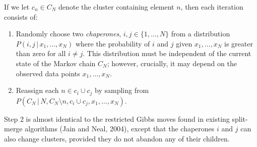 \documentclass[portrait,a0b,final]{a0poster}
\newcommand{\g}{\,|\,}
\newenvironment{poster}{
  \begin{center}
  \begin{minipage}[c]{0.98\textwidth}
}{
  \end{minipage}
  \end{center}
}
\newcommand{\pbox}[4]{
\psshadowbox[#3]{
\begin{minipage}[t][#2][t]{#1}
#4
\end{minipage}
}}
\begin{document}
\begin{poster}
\begin{multicols}{3}
If we let $c_n \in C_N$ denote the cluster containing
element $n$, then each iteration consists of: 
\begin{enumerate}[label=\textbf{\arabic*.}]
\item Randomly choose two \emph{chaperones}, $i, j \in \{1, \ldots,
  N\}$ from a distribution $P(i, j \g x_1, \ldots, x_N)$ where the
  probability of $i$ and $j$ given $x_1, \ldots, x_N$ is greater
  than zero for all $i \neq j$. This distribution must be
  independent of the current state of the Markov chain $C_N$;
  however, crucially, it may depend on the observed data points
  $x_1, \ldots, x_N$.

\item Reassign each $n \in c_i \cup c_j$ by sampling from $P(C_N \g N,
  C_N \!\setminus\! n, c_i \cup c_j, x_1, \ldots, x_N)$.
\end{enumerate}

\vspace*{0.5em}

Step 2 is almost identical to the restricted
Gibbs moves found in existing split-merge algorithms (Jain and Neal, 2004), except that the chaperones $i$ and $j$ can also
change clusters, provided they do not abandon any of their children.
\vspace*{1em}








\vspace{.25cm}\begin{center}\pbox{0.8\columnwidth}{}{linewidth=2mm,framearc=0.1,linecolor=lightblue,
fillstyle=gradient,gradangle=0,gradbegin=white,gradend=whiteblue,gradmidpoint=1.0,framesep=1em}
{\begin{center}{\large \bf Experiments}\end{center}}\end{center}\vspace{.3cm}
\vspace*{1em}


\end{multicols}
\end{poster}
\end{document}
